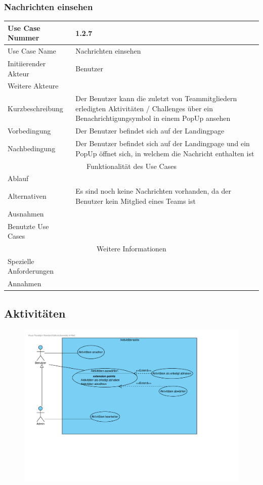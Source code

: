 \documentclass[10pt,a4paper]{article}
\begin{document}
		\subsubsection{Nachrichten einsehen}
		\begin{tabular}{|l|p{.5\linewidth}|}
			\hline Use Case Nummer & 1.2.7 \\ 
			\hline Use Case Name & Nachrichten einsehen \\ 
			\hline Initiierender Akteur & Benutzer \\
			\hline Weitere Akteure & \\
			\hline Kurzbeschreibung & Der Benutzer kann die zuletzt von Teammitgliedern erledigten Aktivitäten / Challenges über ein Benachrichtigungsymbol in einem PopUp ansehen \\
			\hline Vorbedingung & Der Benutzer befindet sich auf der Landingpage \\
			\hline Nachbedingung & Der Benutzer befindet sich auf der Landingpage und ein PopUp öffnet sich, in welchem die Nachricht enthalten ist \\ %
			\hline \multicolumn{2}{|c|}{Funktionalität des Use Cases}\\
			\hline Ablauf & \\
			\hline Alternativen & Es sind noch keine Nachrichten vorhanden, da der Benutzer kein Mitglied eines Teams ist \\
			\hline Ausnahmen & \\
			\hline Benutzte Use Cases & \\
			\hline \multicolumn{2}{|c|}{Weitere Informationen} \\
			\hline Spezielle Anforderungen & \\
			\hline Annahmen & \\
			\hline
		\end{tabular}
\subsection{Aktivit\"aten}

	\begin{figure}[h!]
		\includegraphics[width=\linewidth]{gfx/webseite/Aktivitaetenseite.pdf}
	\end{figure}
\end{document}
